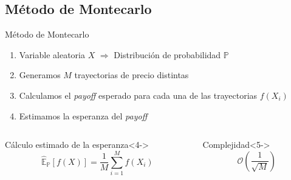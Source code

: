 \subsection{Método de Montecarlo}
\begin{frame}{Método de Montecarlo}
    \begin{enumerate}
        \item<1-> Variable aleatoria $X$ $\Longrightarrow$ Distribución de probabilidad $\mathbb{P}$
        \item<2-> Generamos $M$ trayectorias de precio distintas
        \item<3-> Calculamos el \textit{payoff} esperado para cada una de las trayectorias $f(X_i)$
        \item<4-> Estimamos la esperanza del \textit{payoff}
    \end{enumerate}
    
    \begin{columns}
        \begin{column}{.5\textwidth}
            \begin{block}{Cálculo estimado de la esperanza}<4->
                \begin{equation}
                    \widehat{\mathbb{E}}_\mathbb{P}\left[f\left(X\right)\right] = \frac{1}{M}\sum^M_{i=1}f\left(X_i\right)
                \end{equation}
            \end{block}
        \end{column}%
        \begin{column}{.5\textwidth}
            \begin{alertblock}{Complejidad}<5->
                \begin{equation*}
                    \mathcal{O}\left(\frac{1}{\sqrt{M}}\right)
                \end{equation*}
            \end{alertblock}
        \end{column}
    \end{columns}
\end{frame}
